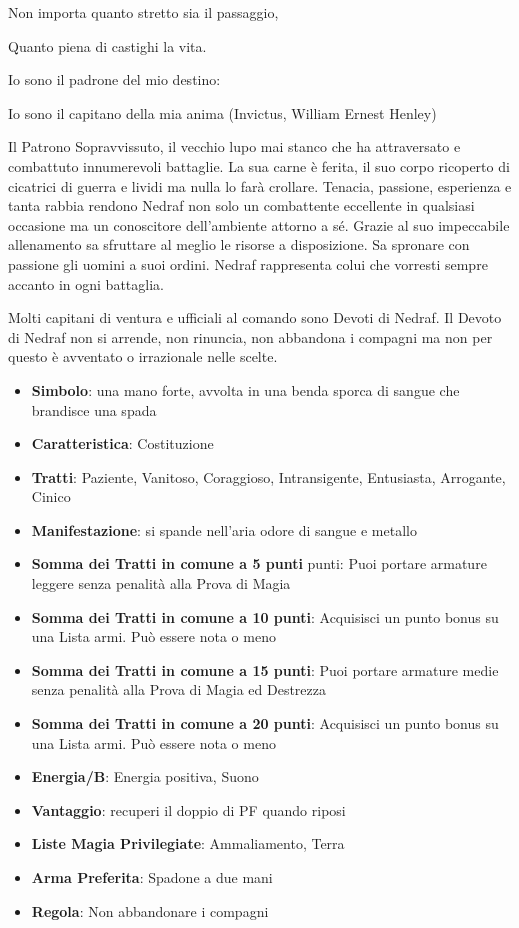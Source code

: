 \begin{multicols}{2}
\begin{changemargin}{0.3cm}{0.3cm}
\begin{enfasi}
{Non importa quanto stretto sia il passaggio,

Quanto piena di castighi la vita.

Io sono il padrone del mio destino:

Io sono il capitano della mia anima (Invictus, William Ernest Henley)
}\end{enfasi}\end{changemargin}\medskip


Il Patrono Sopravvissuto, il vecchio lupo mai stanco che ha attraversato e combattuto innumerevoli battaglie. La sua carne è ferita, il suo corpo ricoperto di cicatrici di guerra e lividi ma nulla lo farà crollare. Tenacia, passione, esperienza e tanta rabbia rendono Nedraf non solo un combattente eccellente in qualsiasi occasione ma un conoscitore dell'ambiente attorno a sé. Grazie al suo impeccabile allenamento sa sfruttare al meglio le risorse a disposizione. Sa spronare con passione gli uomini a suoi ordini.
Nedraf rappresenta colui che vorresti sempre accanto in ogni battaglia.

Molti capitani di ventura e ufficiali al comando sono Devoti di Nedraf. Il Devoto di Nedraf non si arrende, non rinuncia, non abbandona i compagni ma non per questo è avventato o irrazionale nelle scelte.

\begin{itemize}[leftmargin=*] \setlength{\itemsep}{0pt}
\item \textbf{Simbolo}: una mano forte, avvolta in una benda sporca di sangue che brandisce una spada
\item \textbf{Caratteristica}: Costituzione
\item \textbf{Tratti}: Paziente, Vanitoso, Coraggioso, Intransigente, Entusiasta, Arrogante, Cinico
\item \textbf{Manifestazione}: si spande nell'aria odore di sangue e metallo
\item \textbf{Somma dei Tratti in comune a 5 punti} punti: Puoi portare armature leggere senza penalità alla Prova di Magia
\item \textbf{Somma dei Tratti in comune a 10 punti}: Acquisisci un punto bonus su una Lista armi. Può essere nota o meno
\item \textbf{Somma dei Tratti in comune a 15 punti}: Puoi portare armature medie senza penalità alla Prova di Magia ed Destrezza
\item \textbf{Somma dei Tratti in comune a 20 punti}: Acquisisci un punto bonus su una Lista armi. Può essere nota o meno
\item \textbf{Energia/B}: Energia positiva, Suono
\item \textbf{Vantaggio}: recuperi il doppio di PF quando riposi
\item \textbf{Liste Magia Privilegiate}: Ammaliamento, Terra
\item \textbf{Arma Preferita}: Spadone a due mani
\item \textbf{Regola}: Non abbandonare i compagni
\end{itemize}


\end{multicols}
